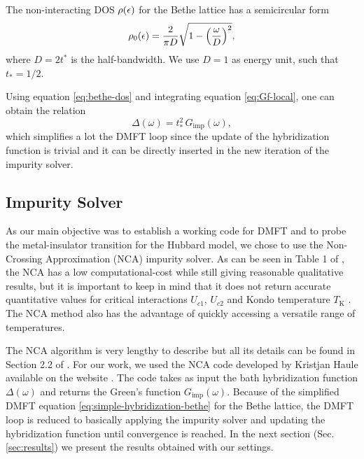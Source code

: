 \documentclass[12pt]{report}
\begin{document}
The non-interacting DOS $\rho(\epsilon)$ for the Bethe lattice has a semicircular form \cite{georges1996}
\begin{equation} \label{eq:bethe-dos}
\rho_0(\epsilon) = \frac{2}{\pi D} \sqrt{1-\qty(\frac{\omega}{D})^2},
\end{equation}
where $D = 2t^*$ is the half-bandwidth. We use $D = 1$ as energy unit, such that $t_* = 1/2$.


Using equation \ref{eq:bethe-dos} and integrating equation \ref{eq:Gf-local}, one can obtain the relation \cite{thesis_bruno}
\begin{equation} \label{eq:simple-hybridization-bethe}
\Delta(\omega) = t_*^2 \, G_{\text{imp}}(\omega),
\end{equation}
which simplifies a lot the DMFT loop since the update of the hybridization function is trivial and it can be directly inserted in the new iteration of the impurity solver.

\subsection{Impurity Solver} \label{sec:impurity-solver}

As our main objective was to establish a working code for DMFT and to probe the metal-insulator transition for the Hubbard model, we chose to use the Non-Crossing Approximation (NCA) impurity solver. As can be seen in Table 1 of \cite{impurity-solvers}, the NCA has a low computational-cost while still giving reasonable qualitative results, but it is important to keep in mind that it does not return accurate quantitative values for critical interactions $U_{c1}$, $U_{c2}$ and Kondo temperature $T_{\text{K}}$ \cite{haule_real_materials, vildosola2015}. The NCA method also has the advantage of quickly accessing a versatile range of temperatures.

The NCA algorithm is very lengthy to describe but all its details can be found in Section 2.2 of \cite{thesis_bruno}. For our work, we used the NCA code developed by Kristjan Haule available on the website \cite{hauleweb}. The code takes as input the bath hybridization function $\Delta(\omega)$ and returns the Green's function $G_{\text{imp}}(\omega)$. Because of the simplified DMFT equation \ref{eq:simple-hybridization-bethe} for the Bethe lattice, the DMFT loop is reduced to basically applying the impurity solver and updating the hybridization function until convergence is reached. In the next section (Sec. \ref{sec:results}) we present the results obtained with our settings.
\end{document}

